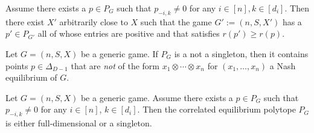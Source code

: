 \documentclass[10pt,a4paper]{amsart}
\begin{document}
\begin{corollary}
\label{CorollaryNonZero}
Assume there exists a $p \in P_G$ such that $p_{-i,k} \neq 0$ for any
$i \in [n], k \in [d_i]$. Then there exist $X'$ arbitrarily close to $X$
such that the game $G':=(n,S,X')$ has a $p' \in P_{G'}$ all of whose
entries are positive and that satisfies $r(p') \geq r(p)$.
\end{corollary}

\begin{proposition} \label{prop:NotAllNash}
    Let $G=(n,S,X)$ be a generic game. If $P_G$ is a not a singleton, then it contains points $p \in \Delta_{D-1}$ that are {\em not} of the form $x_1 \otimes \cdots \otimes x_n$ for $(x_1,\ldots,x_n)$ a Nash equilibrium of $G$.
\end{proposition}

\begin{theorem}
\label{TheoremFullOrSingleton}
Let $G=(n,S,X)$ be a generic game. Assume there exists a $p \in P_G$ such that $p_{-i,k} \neq 0$ for any $i \in [n]$, $k \in [d_i]$. Then the correlated equilibrium polytope $P_G$ is either full-dimensional or a singleton.     
\end{theorem}
\end{document}
